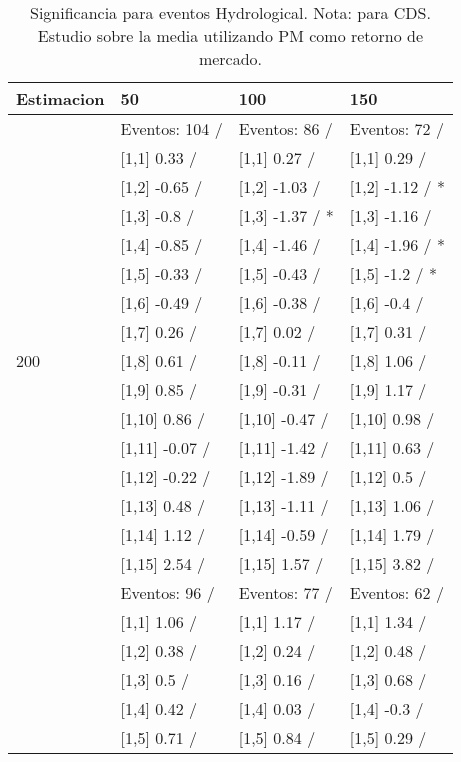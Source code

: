 \begin{table}

\caption{Significancia para eventos Hydrological. Nota: para CDS. Estudio sobre la media utilizando PM como retorno de mercado.}
\centering
\begin{tabular}[t]{llll}
\toprule
Estimacion & 50 & 100 & 150\\
\midrule
 & Eventos:  104 / & Eventos:  86 / & Eventos:  72 /\\
 & {}[1,1] 0.33  / & {}[1,1] 0.27  / & {}[1,1] 0.29  /\\
 & {}[1,2] -0.65  / & {}[1,2] -1.03  / & {}[1,2] -1.12  / *\\
 & {}[1,3] -0.8  / & {}[1,3] -1.37  / * & {}[1,3] -1.16  /\\
 & {}[1,4] -0.85  / & {}[1,4] -1.46  / & {}[1,4] -1.96  / *\\
\addlinespace
 & {}[1,5] -0.33  / & {}[1,5] -0.43  / & {}[1,5] -1.2  / *\\
 & {}[1,6] -0.49  / & {}[1,6] -0.38  / & {}[1,6] -0.4  /\\
 & {}[1,7] 0.26  / & {}[1,7] 0.02  / & {}[1,7] 0.31  /\\
200 & {}[1,8] 0.61  / & {}[1,8] -0.11  / & {}[1,8] 1.06  /\\
 & {}[1,9] 0.85  / & {}[1,9] -0.31  / & {}[1,9] 1.17  /\\
\addlinespace
 & {}[1,10] 0.86  / & {}[1,10] -0.47  / & {}[1,10] 0.98  /\\
 & {}[1,11] -0.07  / & {}[1,11] -1.42  / & {}[1,11] 0.63  /\\
 & {}[1,12] -0.22  / & {}[1,12] -1.89  / & {}[1,12] 0.5  /\\
 & {}[1,13] 0.48  / & {}[1,13] -1.11  / & {}[1,13] 1.06  /\\
 & {}[1,14] 1.12  / & {}[1,14] -0.59  / & {}[1,14] 1.79  /\\
\addlinespace
 & {}[1,15] 2.54  / & {}[1,15] 1.57  / & {}[1,15] 3.82  /\\
 & Eventos:  96 / & Eventos:  77 / & Eventos:  62 /\\
 & {}[1,1] 1.06  / & {}[1,1] 1.17  / & {}[1,1] 1.34  /\\
 & {}[1,2] 0.38  / & {}[1,2] 0.24  / & {}[1,2] 0.48  /\\
 & {}[1,3] 0.5  / & {}[1,3] 0.16  / & {}[1,3] 0.68  /\\
\addlinespace
 & {}[1,4] 0.42  / & {}[1,4] 0.03  / & {}[1,4] -0.3  /\\
 & {}[1,5] 0.71  / & {}[1,5] 0.84  / & {}[1,5] 0.29  /\\

\end{tabular}
\end{table}
